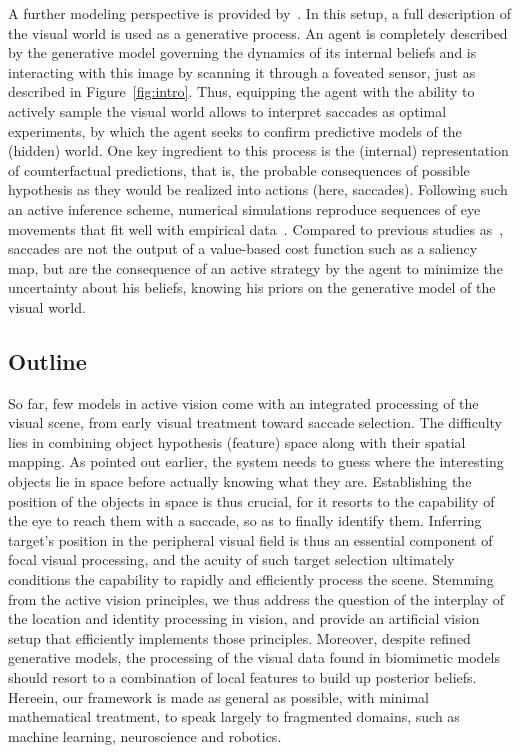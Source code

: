%
A further modeling perspective is provided by~\cite{Friston12}. In this setup, a full description of the visual world is used as a generative process. An agent is completely described by the generative model governing the dynamics of its internal beliefs and is interacting with this image by scanning it through a foveated sensor, just as described in Figure~\ref{fig:intro}. Thus, equipping the agent with the ability to actively sample the visual world allows to interpret saccades as optimal experiments, by which the agent seeks to confirm predictive models of the (hidden) world. One key ingredient to this process is the (internal) representation of counterfactual predictions, that is, the probable consequences of possible hypothesis as they would be realized into actions (here, saccades). Following such an active inference scheme, numerical simulations reproduce sequences of eye movements that fit well with empirical data~\cite{Mirza18}. Compared to previous studies as~\cite{Najemnik05}, saccades are not the output of a value-based cost function such as a saliency map, but are the consequence of an active strategy by the agent to minimize the uncertainty about his beliefs, knowing his priors on the generative model of the visual world.
%
\subsection{Outline}
%
So far, few models in active vision come with an integrated processing of the visual scene, from early visual treatment toward saccade selection. The difficulty lies in combining object hypothesis (feature) space along with their spatial mapping. As pointed out earlier, the system needs to guess where the interesting objects lie in space before actually knowing what they are. Establishing the position of the objects in space is thus crucial, for it resorts to the capability of the eye to reach them with a saccade, so as to finally identify them. Inferring target's position in the peripheral visual field is thus an essential component of focal visual processing, and the acuity of such target selection ultimately conditions the capability to rapidly and efficiently process the scene. Stemming from the active vision principles, we thus address the question of the interplay of the location and identity processing in vision, and provide an artificial vision setup that efficiently implements those principles. Moreover, despite refined generative models, the processing of the visual data found in biomimetic models should resort to a combination of local features to build up posterior beliefs. Hereein, our framework is made as general as possible, with minimal mathematical treatment, to speak largely to fragmented domains, such as machine learning, neuroscience and robotics.

